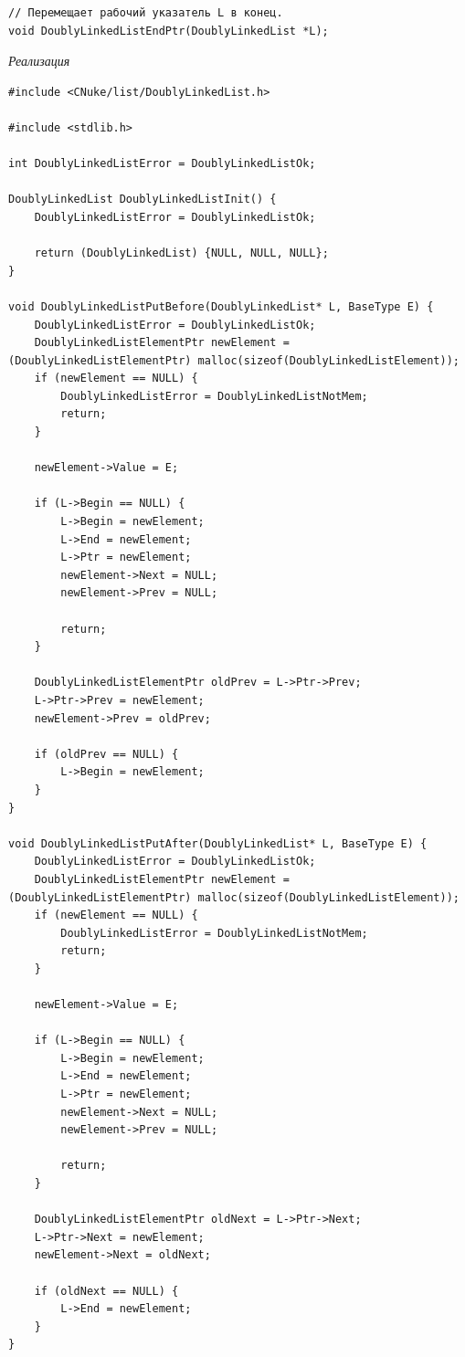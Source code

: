 \documentclass[a4paper,14pt]{extarticle}
\begin{document}
\begin{enumerate}
\begin{verbatim}
// Перемещает рабочий указатель L в конец.
void DoublyLinkedListEndPtr(DoublyLinkedList *L);
    \end{verbatim}
    \textit{Реализация}
\begin{verbatim}
#include <CNuke/list/DoublyLinkedList.h>

#include <stdlib.h>

int DoublyLinkedListError = DoublyLinkedListOk;

DoublyLinkedList DoublyLinkedListInit() {
    DoublyLinkedListError = DoublyLinkedListOk;

    return (DoublyLinkedList) {NULL, NULL, NULL};
}

void DoublyLinkedListPutBefore(DoublyLinkedList* L, BaseType E) {
    DoublyLinkedListError = DoublyLinkedListOk;
    DoublyLinkedListElementPtr newElement = (DoublyLinkedListElementPtr) malloc(sizeof(DoublyLinkedListElement));
    if (newElement == NULL) {
        DoublyLinkedListError = DoublyLinkedListNotMem;
        return;
    }

    newElement->Value = E;

    if (L->Begin == NULL) {
        L->Begin = newElement;
        L->End = newElement;
        L->Ptr = newElement;
        newElement->Next = NULL;
        newElement->Prev = NULL;

        return;
    }

    DoublyLinkedListElementPtr oldPrev = L->Ptr->Prev;
    L->Ptr->Prev = newElement;
    newElement->Prev = oldPrev;

    if (oldPrev == NULL) {
        L->Begin = newElement;
    }
}

void DoublyLinkedListPutAfter(DoublyLinkedList* L, BaseType E) {
    DoublyLinkedListError = DoublyLinkedListOk;
    DoublyLinkedListElementPtr newElement = (DoublyLinkedListElementPtr) malloc(sizeof(DoublyLinkedListElement));
    if (newElement == NULL) {
        DoublyLinkedListError = DoublyLinkedListNotMem;
        return;
    }

    newElement->Value = E;

    if (L->Begin == NULL) {
        L->Begin = newElement;
        L->End = newElement;
        L->Ptr = newElement;
        newElement->Next = NULL;
        newElement->Prev = NULL;

        return;
    }

    DoublyLinkedListElementPtr oldNext = L->Ptr->Next;
    L->Ptr->Next = newElement;
    newElement->Next = oldNext;

    if (oldNext == NULL) {
        L->End = newElement;
    }
}


\end{verbatim}
\end{enumerate}
\end{document}
